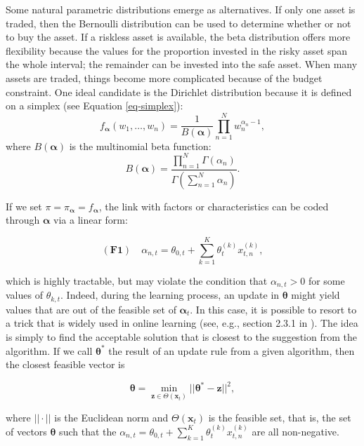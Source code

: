 Some natural parametric distributions emerge as alternatives. If only one asset is traded, then the Bernoulli distribution can be used to determine whether or not to buy the asset. If a riskless asset is available, the beta distribution offers more flexibility because the values for the proportion invested in the risky asset span the whole interval; the remainder can be invested into the safe asset. When many assets are traded, things become more complicated because of the budget constraint. One ideal candidate is the Dirichlet distribution because it is defined on a simplex (see Equation \ref{eq-simplex}):
\begin{equation}
f_{\boldsymbol{\alpha}}(w_1,\dots,w_n)=\frac{1}{B(\boldsymbol{\alpha})}\prod_{n=1}^Nw_n^{\alpha_n-1},
\end{equation}
where $B(\boldsymbol{\alpha})$ is the multinomial beta function:
\begin{equation}
B(\boldsymbol{\alpha})=\frac{\prod_{n=1}^N\Gamma(\alpha_n)}{\Gamma\left(\sum_{n=1}^N\alpha_n \right)}.
\end{equation}

If we set $\pi=\pi_{\boldsymbol{\alpha}}=f_{\boldsymbol{\alpha}}$, the link with factors or characteristics can be coded through ${\boldsymbol{\alpha}}$ via a linear form:

\begin{equation}
(\textbf{F1}) \quad  \alpha_{n,t}=\theta_{0,t} + \sum_{k=1}^K \theta_{t}^{(k)}x_{t,n}^{(k)},
\end{equation}

which is highly tractable, but may violate the condition that $\alpha_{n,t}>0$ for some values of $\theta_{k,t}$. Indeed, during the learning process, an update in $\boldsymbol{\theta}$ might yield values that are out of the feasible set of $\boldsymbol{\alpha}_t$. In this case, it is possible to resort to a trick that is widely used in online learning (see, e.g., section 2.3.1 in \cite{hoi2018online}). The idea is simply to find the acceptable solution that is closest to the suggestion from the algorithm. If we call $\boldsymbol{\theta}^*$ the result of an update rule from a given algorithm, then the closest feasible vector is

\begin{equation}
\boldsymbol{\theta}= \underset{\textbf{z} \in \Theta(\textbf{x}_t)}{\min} ||\boldsymbol{\theta}^*-\textbf{z}||^2,
\end{equation}

where $||\cdot||$ is the Euclidean norm and $\Theta(\textbf{x}_t)$ is the feasible set, that is, the set of vectors $\boldsymbol{\theta}$ such that the $\alpha_{n,t}=\theta_{0,t} + \sum_{k=1}^K \theta_{t}^{(k)}x_{t,n}^{(k)}$ are all non-negative.

